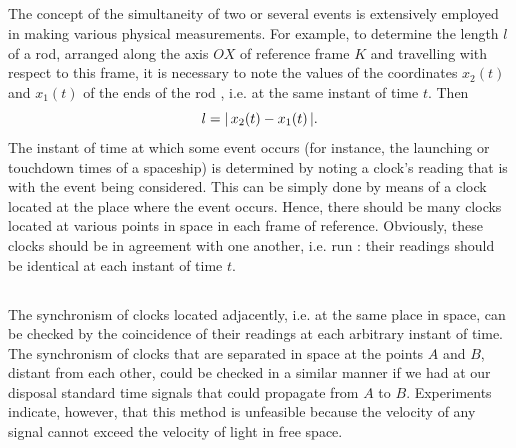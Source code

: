 \subsection{}\label{5.2.1} The concept of the simultaneity of two or several events is extensively employed in making various physical measure­ments. For example, to determine the length $l$ of a rod, arranged along the axis $OX$ of reference frame $K$ and travelling with respect to this frame, it is necessary to note the values of the coordinates $x_{2}(t)$and $x_{1}(t)$ of the ends of the rod , i.e. at the same instant of time $t$. Then
\begin{equation*}%
l = \abs{\,x_{2}(t) - x_{1}(t)\,}.
\end{equation*}
The instant of time at which some event occurs (for instance, the launching or touchdown times of a spaceship) is determined by noting a clock's reading that is  with the event being considered. This can be simply done by means of a clock located at the place where the event occurs. Hence, there should be many clocks located at various points in space in each frame of reference. Obviously, these clocks should be in agreement with one another, i.e. run : their readings should be identical at each instant of time $t$.

\subsection{}\label{5.2.2} The synchronism of clocks located adjacently, i.e. at the same place in space, can be checked by the coincidence of their readings at each arbitrary instant of time. The synchronism of clocks that are separated in space at the points $A$ and $B$, distant from each other, could be checked in a similar manner if we had at our disposal standard time signals that could pro­pagate  from $A$ to $B$. Experiments indicate, however, that this method is unfeasible because the velocity of any signal cannot exceed the velocity of light in free space.

